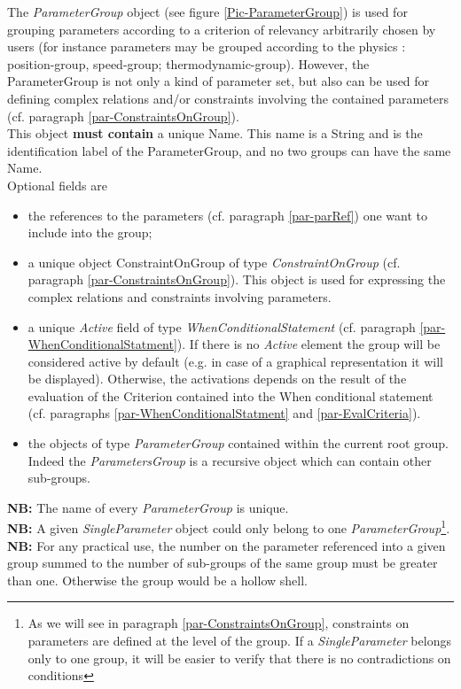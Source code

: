 \documentclass[a4paper,11pt] {ivoa}
\begin{document}
The {\it ParameterGroup} object (see figure \ref{Pic-ParameterGroup}) is used for grouping
parameters according to a criterion of relevancy arbitrarily chosen by users (for instance
parameters may be grouped according to the physics : position-group, speed-group; thermodynamic-group).
However,  the ParameterGroup is not only a kind of parameter set, but also can be used for
defining complex relations and/or constraints involving the contained parameters (cf. paragraph
\ref{par-ConstraintsOnGroup}).\\
This object {\bf must contain} a unique Name. This name is a String and is the identification label
of the ParameterGroup, and no two groups can have the same Name.\\
Optional fields are
\begin{itemize}
\item the references to the parameters (cf. paragraph \ref{par-parRef}) one want to include into the
group;
\item a unique object ConstraintOnGroup of type {\it ConstraintOnGroup} (cf. paragraph 
\ref{par-ConstraintsOnGroup}). This object is used for expressing the complex relations and
constraints involving parameters.
\item a unique {\it Active} field of type {\it WhenConditionalStatement} (cf. paragraph \ref{par-WhenConditionalStatment}). If there is no {\it Active} element the group will be considered active by default  (e.g. in case of a graphical representation it will be displayed). Otherwise, the activations depends on the result of the evaluation of the Criterion contained into the  When conditional statement (cf. paragraphs \ref{par-WhenConditionalStatment} and \ref{par-EvalCriteria}).

 
\item the objects of type {\it ParameterGroup} contained within the current root group. Indeed the
{\it ParametersGroup} is a recursive object which can contain other sub-groups.
\end{itemize}

{\bf NB:} The name of every {\it ParameterGroup} is unique.\\

{\bf NB:} A given {\it SingleParameter} object could only belong to one {\it
ParameterGroup}\footnote{As we will see in paragraph \ref{par-ConstraintsOnGroup}, constraints on
parameters are defined at the level of the group. If a {\it SingleParameter} belongs only to one
group, it will be easier to verify that there is no contradictions on conditions}.
{\bf NB:}  For any practical use, the number on the parameter referenced into a given group summed
to the number of sub-groups of the same group must be greater than one. Otherwise the group would be
a hollow shell.
\end{document}
